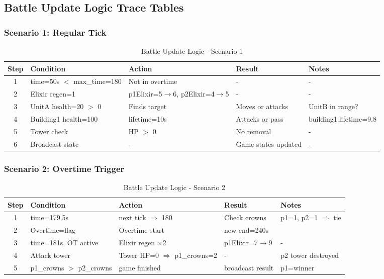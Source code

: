 \documentclass{article}
\begin{document}
\FloatBarrier

\subsection{Battle Update Logic Trace Tables}

\subsubsection{Scenario 1: Regular Tick}
\begin{table}[H]
\centering
\footnotesize
\begin{tabularx}{\textwidth}{|c|p{2cm}|X|p{3cm}|X|}
\hline
\textbf{Step} & \textbf{Condition} & \textbf{Action} & \textbf{Result} & \textbf{Notes}\\
\hline
1 & time=50s $<$ max\_time=180 & Not in overtime & - & - \\
\hline
2 & Elixir regen=1 & p1Elixir=5$\rightarrow$6, p2Elixir=4$\rightarrow$5 & - & - \\
\hline
3 & UnitA health=20 $>$ 0 & Finds target & Moves or attacks & UnitB in range? \\
\hline
4 & Building1 health=100 & lifetime=10s & Attacks or pass & building1.lifetime=9.8 \\
\hline
5 & Tower check & HP $>$ 0 & No removal & - \\
\hline
6 & Broadcast state & - & Game states updated & - \\
\hline
\end{tabularx}
\caption{Battle Update Logic - Scenario 1}
\end{table}

\subsubsection{Scenario 2: Overtime Trigger}
\begin{table}[H]
\centering
\footnotesize
\begin{tabularx}{\textwidth}{|c|p{2cm}|X|p{3cm}|X|}
\hline
\textbf{Step} & \textbf{Condition} & \textbf{Action} & \textbf{Result} & \textbf{Notes}\\
\hline
1 & time=179.5s & next tick $\Rightarrow$ 180 & Check crowns & p1=1, p2=1 $\Rightarrow$ tie \\
\hline
2 & Overtime=flag & Overtime start & new end=240s & \\
\hline
3 & time=181s, OT active & Elixir regen $\times$2 & p1Elixir=7$\rightarrow$9 & - \\
\hline
4 & Attack tower & Tower HP=0 $\Rightarrow$ p1\_crowns=2 & - & p2 tower destroyed \\
\hline
5 & p1\_crowns $>$ p2\_crowns & game finished & broadcast result & p1=winner \\
\hline
\end{tabularx}
\caption{Battle Update Logic - Scenario 2}
\end{table}
\end{document}
